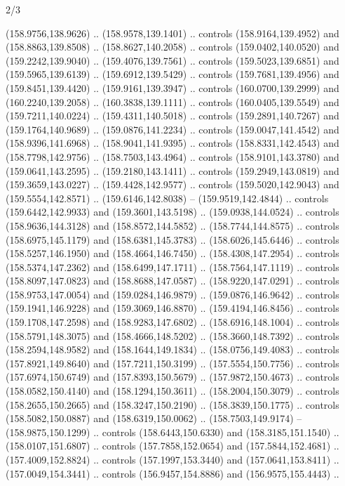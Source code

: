 \begin{flagdescription}{2/3}
\begin{scope}[shift={(0.5\flaglength,0.5)},scale=\flagwidth/320]
\begin{scope}[y=0.8pt, x=0.8pt, yscale=-1,shift={(-118.3,-146)}]
  (158.9756,138.9626) .. (158.9578,139.1401) .. controls (158.9164,139.4952) and
  (158.8863,139.8508) .. (158.8627,140.2058) .. controls (159.0402,140.0520) and
  (159.2242,139.9040) .. (159.4076,139.7561) .. controls (159.5023,139.6851) and
  (159.5965,139.6139) .. (159.6912,139.5429) .. controls (159.7681,139.4956) and
  (159.8451,139.4420) .. (159.9161,139.3947) .. controls (160.0700,139.2999) and
  (160.2240,139.2058) .. (160.3838,139.1111) .. controls (160.0405,139.5549) and
  (159.7211,140.0224) .. (159.4311,140.5018) .. controls (159.2891,140.7267) and
  (159.1764,140.9689) .. (159.0876,141.2234) .. controls (159.0047,141.4542) and
  (158.9396,141.6968) .. (158.9041,141.9395) .. controls (158.8331,142.4543) and
  (158.7798,142.9756) .. (158.7503,143.4964) .. controls (158.9101,143.3780) and
  (159.0641,143.2595) .. (159.2180,143.1411) .. controls (159.2949,143.0819) and
  (159.3659,143.0227) .. (159.4428,142.9577) .. controls (159.5020,142.9043) and
  (159.5554,142.8571) .. (159.6146,142.8038) -- (159.9519,142.4844) .. controls
  (159.6442,142.9933) and (159.3601,143.5198) .. (159.0938,144.0524) .. controls
  (158.9636,144.3128) and (158.8572,144.5852) .. (158.7744,144.8575) .. controls
  (158.6975,145.1179) and (158.6381,145.3783) .. (158.6026,145.6446) .. controls
  (158.5257,146.1950) and (158.4664,146.7450) .. (158.4308,147.2954) .. controls
  (158.5374,147.2362) and (158.6499,147.1711) .. (158.7564,147.1119) .. controls
  (158.8097,147.0823) and (158.8688,147.0587) .. (158.9220,147.0291) .. controls
  (158.9753,147.0054) and (159.0284,146.9879) .. (159.0876,146.9642) .. controls
  (159.1941,146.9228) and (159.3069,146.8870) .. (159.4194,146.8456) .. controls
  (159.1708,147.2598) and (158.9283,147.6802) .. (158.6916,148.1004) .. controls
  (158.5791,148.3075) and (158.4666,148.5202) .. (158.3660,148.7392) .. controls
  (158.2594,148.9582) and (158.1644,149.1834) .. (158.0756,149.4083) .. controls
  (157.8921,149.8640) and (157.7211,150.3199) .. (157.5554,150.7756) .. controls
  (157.6974,150.6749) and (157.8393,150.5679) .. (157.9872,150.4673) .. controls
  (158.0582,150.4140) and (158.1294,150.3611) .. (158.2004,150.3079) .. controls
  (158.2655,150.2665) and (158.3247,150.2190) .. (158.3839,150.1775) .. controls
  (158.5082,150.0887) and (158.6319,150.0062) .. (158.7503,149.9174) --
  (158.9875,150.1299) .. controls (158.6443,150.6330) and (158.3185,151.1540) ..
  (158.0107,151.6807) .. controls (157.7858,152.0654) and (157.5844,152.4681) ..
  (157.4009,152.8824) .. controls (157.1997,153.3440) and (157.0641,153.8411) ..
  (157.0049,154.3441) .. controls (156.9457,154.8886) and (156.9575,155.4443) ..

\end{scope}
\end{scope}
\end{flagdescription}
